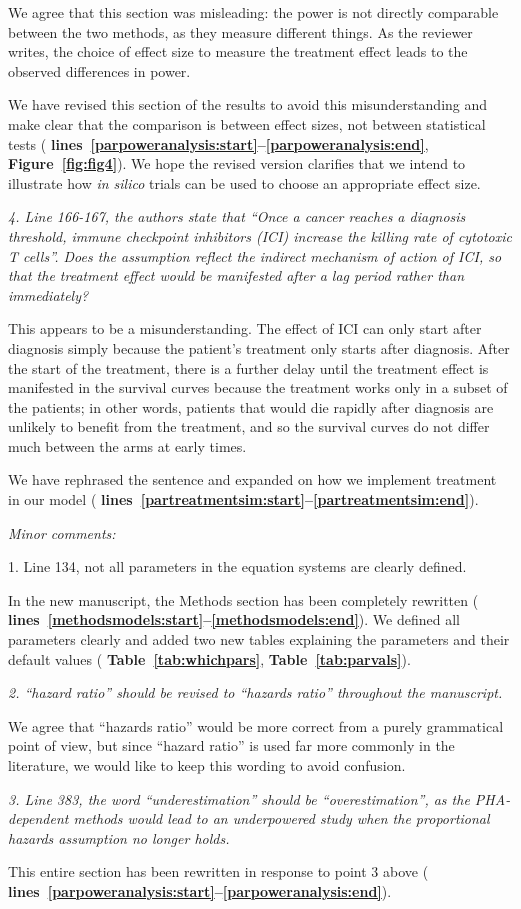 \documentclass{article}
\newcommand{\revr}[1]{{\color{gray} \itshape #1}}
\newcommand{\auth}[1]{{#1}}
\newcommand{\chng}[1]{{\color{blue!70!black} #1}}
\newcommand{\myref}[2]{{\bfseries\color{red!70!black} Figure~\ref{#1}#2}}
\newcommand{\mytref}[1]{{\bfseries\color{red!70!black} Table~\ref{#1}}}
\newcommand{\lr}[1]{{\bfseries\color{red!70!black} lines~\ref{#1:start}--\ref{#1:end}}}
\begin{document}
\auth{We agree that this section was misleading: the power is not directly comparable between the two methods, as they measure different things. As the reviewer writes, the choice of effect size to measure the treatment effect leads to the observed differences in power.}

\chng{We have revised this section of the results to avoid this misunderstanding and make clear that the comparison is between effect sizes, not between statistical tests (\lr{parpoweranalysis}, \myref{fig:fig4}{}). We hope the revised version clarifies that we intend to illustrate how \emph{in silico} trials can be used to choose an appropriate effect size.}

\revr{
4. Line 166-167, the authors state that ``Once a cancer reaches a diagnosis threshold, immune checkpoint inhibitors (ICI) increase the killing rate of cytotoxic T cells''. Does the assumption reflect the indirect mechanism of action of ICI, so that the treatment effect would be manifested after a lag period rather than immediately?
}

\auth{This appears to be a misunderstanding. The effect of ICI can only start after diagnosis simply because the patient's treatment only starts after diagnosis. After the start of the treatment, there is a further delay until the treatment effect is manifested in the survival curves because the treatment works only in a subset of the patients; in other words, patients that would die rapidly after diagnosis are unlikely to benefit from the treatment, and so the survival curves do not differ much between the arms at early times.}

\chng{We have rephrased the sentence and expanded on how we implement treatment in our model (\lr{partreatmentsim}).}

\revr{Minor comments:

1. Line 134, not all parameters in the equation systems are clearly defined.}

\chng{In the new manuscript, the Methods section has been completely rewritten (\lr{methodsmodels}). We defined all parameters clearly and added two new tables explaining the parameters and their default values (\mytref{tab:whichpars}, \mytref{tab:parvals}).}

\revr{2. ``hazard ratio'' should be revised to ``hazards ratio'' throughout the manuscript.}

\auth{We agree that ``hazards ratio'' would be more correct from a purely grammatical point of view, but since ``hazard ratio'' is used far more commonly in the literature, we would like to keep this wording to avoid confusion.}

\revr{3. Line 383, the word “underestimation” should be “overestimation”, as the PHA-dependent methods would lead to an underpowered study when the proportional hazards assumption no longer holds.}

\chng{This entire section has been rewritten in response to point 3 above (\lr{parpoweranalysis}).}



\end{document}
